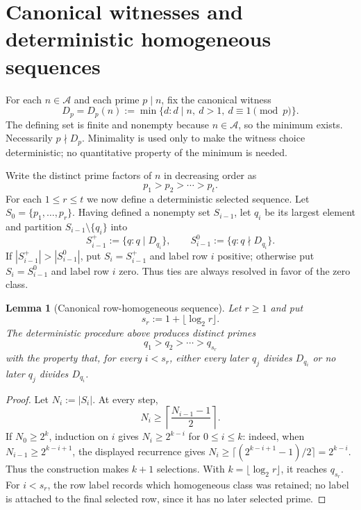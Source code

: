 \documentclass[11pt]{amsart}
\newtheorem{lemma}[lemma]{Lemma}
\theoremstyle{definition}
\theoremstyle{remark}
\numberwithin{equation}{section}
\newcommand{\Acal}{\mathcal A}
\begin{document}
\section{Canonical witnesses and deterministic homogeneous sequences}

For each $n\in\Acal$ and each prime $p\mid n$, fix the canonical witness
\begin{equation}\label{eq:canonical-witness}
 D_p=D_p(n):=\min\{d:d\mid n,\ d>1,\ d\equiv1\pmod p\}.
\end{equation}
The defining set is finite and nonempty because $n\in\Acal$, so the
minimum exists.  Necessarily $p\nmid D_p$.  Minimality is used only to make
the witness choice deterministic; no quantitative property of the minimum
is needed.

Write the distinct prime factors of $n$ in decreasing order as
\[
 p_1>p_2>\cdots>p_t.
\]
For each $1\le r\le t$ we now define a deterministic selected sequence.  Let $S_0=\{p_1,\ldots,p_r\}$.  Having defined a nonempty set $S_{i-1}$, let $q_i$ be its largest element and partition $S_{i-1}\setminus\{q_i\}$ into
\[
 S_{i-1}^{+}:=\{q:q\mid D_{q_i}\},
 \qquad
 S_{i-1}^{0}:=\{q:q\nmid D_{q_i}\}.
\]
If $|S_{i-1}^{+}|>|S_{i-1}^{0}|$, put $S_i=S_{i-1}^{+}$ and label row $i$ positive; otherwise put $S_i=S_{i-1}^{0}$ and label row $i$ zero.  Thus ties are always resolved in favor of the zero class.

\begin{lemma}[Canonical row-homogeneous sequence]\label{lem:homogeneous-sequence}
Let $r\ge1$ and put
\[
 s_r:=1+\lfloor\log_2r\rfloor.
\]
The deterministic procedure above produces distinct primes
\[
 q_1>q_2>\cdots>q_{s_r}
\]
with the property that, for every $i<s_r$, either every later $q_j$ divides $D_{q_i}$ or no later $q_j$ divides $D_{q_i}$.
\end{lemma}

\begin{proof}
Let $N_i:=|S_i|$.  At every step,
\[
 N_i\ge\left\lceil\frac{N_{i-1}-1}{2}\right\rceil.
\]
If $N_0\ge2^k$, induction on $i$ gives
$N_i\ge2^{k-i}$ for $0\le i\le k$: indeed, when
$N_{i-1}\ge2^{k-i+1}$, the displayed recurrence gives
$N_i\ge\lceil(2^{k-i+1}-1)/2\rceil=2^{k-i}$.  Thus the construction
makes $k+1$ selections.  With $k=\lfloor\log_2r\rfloor$, it reaches
$q_{s_r}$.  For $i<s_r$, the row label records which homogeneous class was retained;
no label is attached to the final selected row, since it has no later
selected prime.
\end{proof}
\end{document}
